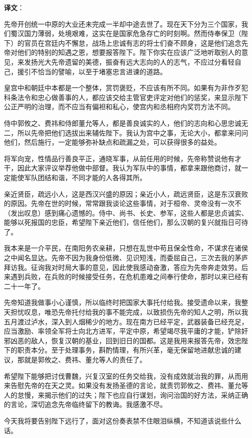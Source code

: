 \documentclass[12pt,UTF-8,openany,a4]{ctexbook}
\begin{document}
\newpage

\begin{Large}
   \noindent \textbf{译文}：
\end{Large}

\vspace{1em}

\begin{large}\yiwen
    
    先帝开创统一中原的大业还未完成一半却中途去世了。现在天下分为三个国家，我们蜀汉国力薄弱，处境艰难，这实在是国家危急存亡的时刻啊。然而侍奉保卫（陛下）的官员在宫廷内不懈怠，战场上忠诚有志的将士们奋不顾身，这是他们追念先帝对他们的特别的知遇之恩，想要报答陛下。陛下你实在应该广泛地听取别人的意见，来发扬光大先帝遗留的美德，振奋有远大志向的人的志气，不应过分看轻自己，援引不恰当的譬喻，以至于堵塞忠言进谏的道路。
    
    皇宫中和朝廷中本都是一个整体，赏罚褒贬，不应该有所不同。如果有为非作歹犯科条法令和忠心做善事的人，都应该交给主管官吏评定对他们的惩奖，来显示陛下公正严明的治理，而不应当有偏袒和私心，使宫内和丞相府内奖罚方法不同。
    
    侍中郭攸之、费祎和侍郎董允等人，都是善良诚实的人，他们的志向和心思忠诚无二，所以先帝把他们选拔出来辅佐陛下。我认为宫中之事，无论大小，都拿来问问他们，然后施行，一定能够弥补缺点和疏漏之处，可以获得很多的益处。
    
    将军向宠，性情品行善良平正，通晓军事，从前任用的时候，先帝称赞说他有才干，因此大家评议举荐他做中部督。我认为军队中的事情，都拿来跟他商讨，就一定能使军队团结和谐，不同才能的人各得其所。
    
    亲近贤臣，疏远小人，这是西汉兴盛的原因；亲近小人，疏远贤臣，这是东汉衰败的原因。先帝在世的时候，常常跟我谈论这些事情，对于桓帝、灵帝没有一次不（发出叹息）感到痛心遗憾的。侍中、尚书、长史、参军，这些人都是忠贞诚实、能够以死报国的忠臣，希望陛下亲近他们，信任他们，那么汉朝的复兴就指日可待了。
    
    我本来是一介平民，在南阳务农亲耕，只想在乱世中苟且保全性命，不谋求在诸侯之中闻名显达。先帝不因为我身份低微、见识短浅，而委屈自己，三次去我的茅庐拜访我。征询我对时局大事的意见，因此使我感动奋激，答应为先帝奔走效劳。后来遇到兵败，在兵败的时候接受任务，在危机患难之间奉行使命，那时以来已经有二十一年了。
    
    先帝知道我做事小心谨慎，所以临终时把国家大事托付给我。接受遗命以来，我整天担忧叹息，唯恐先帝托付给我的事不能完成，以致损伤先帝的知人之明，所以我五月渡过泸水，深入到人烟稀少的地方。现在南方已经平定，武器装备已经充足，应当激励、率领全军将士向北方进军，平定中原，希望竭尽我平庸的才能，铲除奸邪凶恶的敌人，恢复汉朝的基业，回到旧日的国都。这是我用来报答先帝，效忠陛下的职责本分。至于处理事务，斟酌情理，有所兴革，毫无保留地进献忠诚的建议，那就是郭攸之、费祎、董允等人的责任了。
    
    希望陛下能够把讨伐曹魏，兴复汉室的任务交给我，没有成效就治我的罪，从而用来告慰先帝的在天之灵。如果没有发扬圣德的言论，就责罚郭攸之、费祎、董允等人的怠慢，来揭示他们的过失；陛下也应自行谋划，询问治国的好方法，采纳正确的言论，深切追念先帝临终留下的教诲。我感激不尽。
    
    今天我将要告别陛下远行了，面对这份奏表禁不住眼泪纵横，不知道该说些什么话。
    

\end{large}
\end{document}
